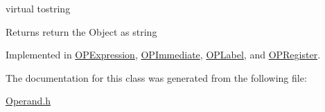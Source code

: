 virtual tostring \begin{DoxyReturn}{Returns}
return the Object as string 
\end{DoxyReturn}


Implemented in \hyperlink{classOPExpression_a6a29cfb44936766a61099835482ea6d1}{OPExpression}, \hyperlink{classOPImmediate_adbf4bcd0bd6be9d6cb0dcbc5e09ff900}{OPImmediate}, \hyperlink{classOPLabel_a94c9cdc5cf0b3af05a1f917c0d650056}{OPLabel}, and \hyperlink{classOPRegister_a233e4744403c78afc8e88e4c804a485f}{OPRegister}.

The documentation for this class was generated from the following file:\begin{DoxyCompactItemize}
\item 
\hyperlink{Operand_8h}{Operand.h}\end{DoxyCompactItemize}
